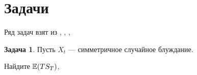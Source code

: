 \documentclass[pdftex,12pt,a4paper]{article}
\numberwithin{equation}{page} %
\theoremstyle{definition} %
\theoremstyle{definition}
\theoremstyle{definition}
\theoremstyle{definition}
\newtheorem{problem}{Задача}
\begin{document}
















\section{Задачи} 

Ряд задач взят из \cite{stirzaker:prp}, \cite{stirzaker:otep}, \cite{zastawniak:bsp}, \cite{blom:pspt}


\begin{problem}

Пусть $X_{t}$ --- симметричное случайное блуждание.

Найдите $\mathbb{E}(TS_{T})$,
\end{problem}
\end{document}
